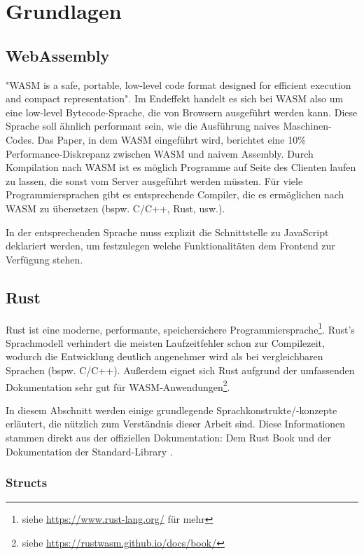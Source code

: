 \chapter{Grundlagen}\label{chap:prereqs}

\section{WebAssembly}

"\ac{WASM} is a safe, portable, low-level code format designed for efficient execution and compact representation"\cite{WebAssemblyCoreSpecification}. Im Endeffekt handelt es sich bei \ac{WASM} also um eine low-level Bytecode-Sprache, die von Browsern ausgeführt werden kann. Diese Sprache soll ähnlich performant sein, wie die Ausführung naives Maschinen-Codes. Das Paper, in dem \ac{WASM} eingeführt wird, berichtet eine 10\% Performance-Diskrepanz zwischen \ac{WASM} und naivem Assembly\cite{10.1145/3062341.3062363}. Durch Kompilation nach \ac{WASM} ist es möglich Programme auf Seite des Clienten laufen zu lassen, die sonst vom Server ausgeführt werden müssten.
Für viele Programmiersprachen gibt es entsprechende Compiler, die es ermöglichen nach \ac{WASM} zu übersetzen (bspw. C/C++, Rust, usw.).

In der entsprechenden Sprache muss explizit die Schnittstelle zu JavaScript deklariert werden, um festzulegen welche Funktionalitäten dem Frontend zur Verfügung stehen.

\section{Rust}

Rust ist eine moderne, performante, speichersichere Programmiersprache\footnote{siehe \url{https://www.rust-lang.org/} für mehr}. Rust's Sprachmodell verhindert die meisten Laufzeitfehler schon zur Compilezeit, wodurch die Entwicklung deutlich angenehmer wird als bei vergleichbaren Sprachen (bspw. C/C++). Außerdem eignet sich Rust aufgrund der umfassenden Dokumentation sehr gut für \ac{WASM}-Anwendungen\footnote{siehe \url{https://rustwasm.github.io/docs/book/}}.

In diesem Abschnitt werden einige grundlegende Sprachkonstrukte/-konzepte erläutert, die nützlich zum Verständnis dieser Arbeit sind.
Diese Informationen stammen direkt aus der offiziellen Dokumentation: Dem Rust Book \cite{rustBook} und der Dokumentation der Standard-Library \cite{rustDoc}.

\subsection{Structs}

